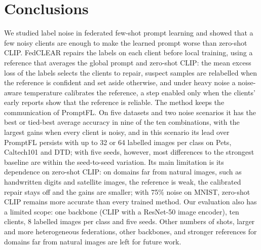 \documentclass[runningheads]{llncs}
\begin{document}

\section{Conclusions}
\label{sec:concl}
We studied label noise in federated few-shot prompt learning and showed that a few noisy clients are
enough to make the learned prompt worse than zero-shot CLIP. FedCLEAR repairs the labels on each client
before local training, using a reference that averages the global prompt and zero-shot CLIP: the mean excess loss of the labels selects the clients to repair, suspect samples are relabelled when the reference is
confident and set aside otherwise, and under heavy noise a noise-aware temperature calibrates the
reference, a step enabled only when the clients' early reports show that the reference is reliable.
The method keeps
the communication of PromptFL. On five datasets and two noise scenarios it has the best or tied-best average
accuracy in nine of the ten combinations, with the largest gains when every client is noisy, and in
this scenario its lead over PromptFL persists with up to 32 or 64 labelled images per class on Pets,
Caltech101 and DTD; with five
seeds, however, most differences to the strongest baseline are within the seed-to-seed variation.
Its main limitation is its dependence on zero-shot CLIP: on domains far from natural images, such as
handwritten digits and satellite images, the reference is weak, the calibrated repair stays off and
the gains are smaller; with 75\% noise on MNIST, zero-shot CLIP remains more accurate than every
trained method. Our evaluation also has a limited scope: one backbone (CLIP with a ResNet-50 image
encoder), ten clients, 8 labelled images per class and five seeds. Other numbers of shots, larger and
more heterogeneous federations, other backbones, and stronger references for domains far from natural
images are left for future work.
\end{document}
